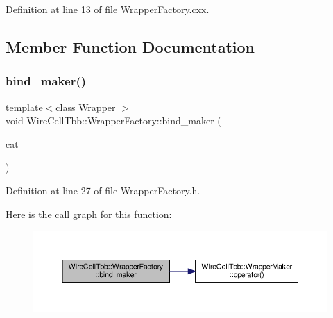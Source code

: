 Definition at line 13 of file Wrapper\+Factory.\+cxx.



\subsection{Member Function Documentation}
\mbox{\label{class_wire_cell_tbb_1_1_wrapper_factory_a2493bed08f1ad70514da1bdcc2a41e02}} 
\subsubsection{\texorpdfstring{bind\+\_\+maker()}{bind\_maker()}}
{\footnotesize\ttfamily template$<$class Wrapper $>$ \\
void Wire\+Cell\+Tbb\+::\+Wrapper\+Factory\+::bind\+\_\+maker (\begin{DoxyParamCaption}\item[{\hyperlink{class_wire_cell_1_1_i_node_a5546e64cbb70bd3ac787295cac9ac803}{Wire\+Cell\+::\+I\+Node\+::\+Node\+Category}}]{cat }\end{DoxyParamCaption})\hspace{0.3cm}{\ttfamily [inline]}}



Definition at line 27 of file Wrapper\+Factory.\+h.

Here is the call graph for this function\+:
\nopagebreak
\begin{figure}[H]
\begin{center}
\leavevmode
\includegraphics[width=350pt]{class_wire_cell_tbb_1_1_wrapper_factory_a2493bed08f1ad70514da1bdcc2a41e02_cgraph}
\end{center}
\end{figure}
\mbox{\label{class_wire_cell_tbb_1_1_wrapper_factory_a97d887294839859ca613d604eaa39cfe}} 
